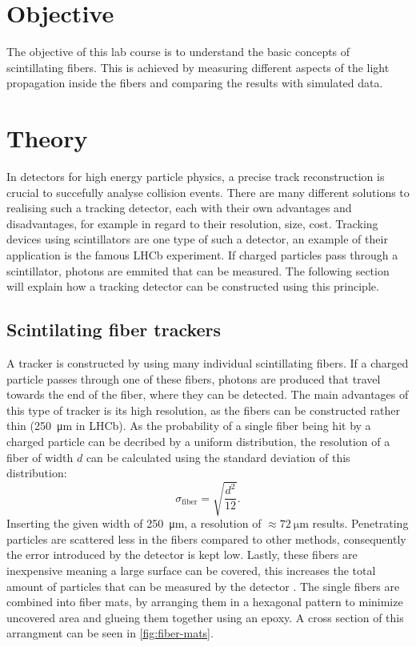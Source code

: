 \section{Objective}
\label{sec:Objective}

The objective of this lab course is to understand the basic concepts of scintillating fibers.
This is achieved by measuring different aspects of the light propagation inside the fibers and comparing the results
with simulated data.

\section{Theory}
\label{sec:Theory}

In detectors for high energy particle physics, a precise track reconstruction is crucial to succefully analyse collision events.
There are many different solutions to realising such a tracking detector, each with their own advantages and disadvantages, for example
in regard to their resolution, size, cost. Tracking devices using scintillators are one type of such a detector, an example of their application is the famous
LHCb experiment. If charged particles pass through a scintillator, photons are emmited that can be measured. The following section will explain
how a tracking detector can be constructed using this principle.

\subsection{Scintilating fiber trackers}

A tracker is constructed by using many individual scintillating fibers. If a charged particle passes through one of these fibers, photons are produced that
travel towards the end of the fiber, where they can be detected. The main advantages of this type of tracker is its high resolution, as the fibers can
be constructed rather thin (\qty{250}{\micro\meter} in LHCb). As the probability of a single fiber being hit by a charged particle can be decribed by a uniform distribution,
the resolution of a fiber of width $d$ can be calculated using the standard deviation of this distribution:
\begin{equation*}
    \sigma_{\text{fiber}} = \sqrt{\frac{d^2}{12}} .
\end{equation*}
Inserting the given width of \qty{250}{\micro\meter}, a resolution of $\approx \qty{72}{\micro\meter}$ results.
Penetrating particles are scattered less in the fibers compared to other methods,
consequently the error introduced by the detector is kept low. Lastly, these fibers are inexpensive meaning a large surface can be covered, this increases
the total amount of particles that can be measured by the detector \cite{SciFi}.
The single fibers are combined into fiber mats, by arranging them in a hexagonal pattern to minimize uncovered area and glueing
them together using an epoxy. A cross section of this arrangment can be seen in \autoref{fig:fiber-mats}.

